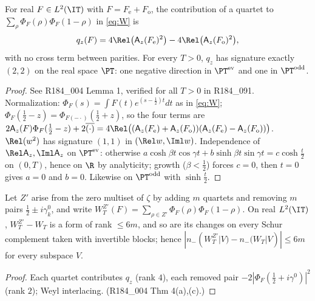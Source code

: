 \begin{lemma}\label{thm:inertia-quartet}
For real $F\in L^2(\IT)$ with $F=F_{\mathrm e}+F_{\mathrm o}$, the contribution of a quartet to
$\sum_\rho\Phi_F(\rho)\Phi_F(1-\rho)$ in \eqref{eq:W} is
\[
q_z(F)=4\Rel\big(\mathsf A_z(F_{\mathrm e})^2\big)-4\Rel\big(\mathsf A_z(F_{\mathrm o})^2\big),
\]
with no cross term between parities. For every $T>0$, $q_z$ has signature exactly $(2,2)$ on the real space
$\PT$: one negative direction in $\PT^{\mathrm{ev}}$ and one in $\PT^{\mathrm{odd}}$.
\end{lemma}
\begin{proof}
See R184\_004 Lemma 1, verified for all $T>0$ in R184\_091. Normalization: $\Phi_F(s)=\int F(t)e^{(s-\frac12)t}dt$ as
in \eqref{eq:W}; $\Phi_F(\frac12-z)=\Phi_{F(-\cdot)}(\frac12+z)$, so the four terms are
$2\mathsf A_z(F)\Phi_F(\frac12-z)+2\overline{(\cdot)}=4\Rel\big((\mathsf A_z(F_{\mathrm e})+\mathsf A_z(F_{\mathrm o}))(\mathsf A_z(F_{\mathrm e})-\mathsf A_z(F_{\mathrm o}))\big)$.
$\Rel(w^2)$ has signature $(1,1)$ in $(\Rel w,\Iml w)$. Independence of $\Rel\mathsf A_z,\Iml\mathsf A_z$ on
$\PT^{\mathrm{ev}}$: otherwise $a\cosh\beta t\cos\gamma t+b\sinh\beta t\sin\gamma t=c\cosh\frac t2$ on $(0,T)$, hence on
$\R$ by analyticity; growth ($\beta<\frac12$) forces $c=0$, then $t=0$ gives $a=0$ and $b=0$. Likewise on
$\PT^{\mathrm{odd}}$ with $\sinh\frac t2$.
\end{proof}

\begin{proposition}\label{thm:inertia-rank}
Let $Z'$ arise from the zero multiset of $\zeta$ by adding $m$ quartets and removing $m$ pairs
$\frac12\pm i\gamma^0_k$, and write $W^{Z'}_T(F)=\sum_{\rho\in Z'}\Phi_F(\rho)\Phi_F(1-\rho)$. On real $L^2(\IT)$,
$W^{Z'}_T-W_T$ is a form of rank $\le6m$, and so are its changes on every Schur complement taken with invertible
blocks; hence $|n_-(W^{Z'}_T|V)-n_-(W_T|V)|\le6m$ for every subspace $V$.
\end{proposition}
\begin{proof}
Each quartet contributes $q_z$ (rank $4$), each removed pair $-2|\Phi_F(\frac12+i\gamma^0)|^2$ (rank $2$); Weyl
interlacing. (R184\_004 Thm 4(a),(c).)
\end{proof}

